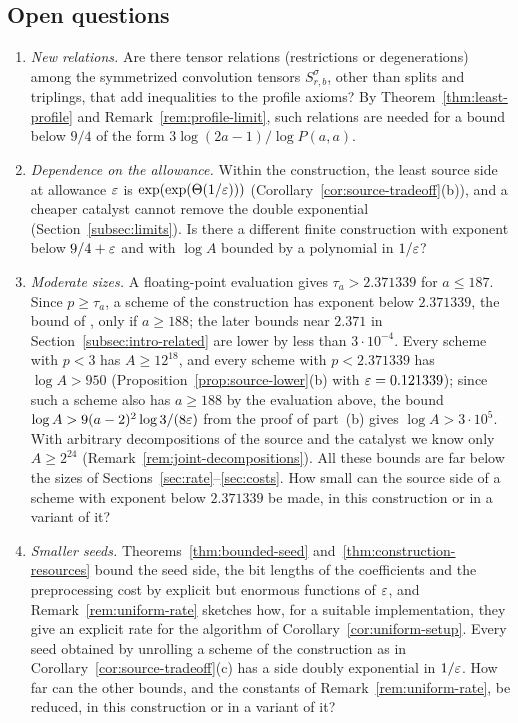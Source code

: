 \subsection{Open questions}
\label{subsec:open-questions}

\begin{enumerate}
\item \emph{New relations.} Are there tensor relations (restrictions or
degenerations) among the symmetrized convolution tensors
\(S^\sigma_{r,b}\), other than splits and triplings, that add
inequalities to the profile axioms? By Theorem~\ref{thm:least-profile}
and Remark~\ref{rem:profile-limit}, such relations are needed for a bound
below \(9/4\) of the form \(3\log(2a-1)/\log P(a,a)\).

\item \emph{Dependence on the allowance.} Within the construction, the
least source side at allowance \(\varepsilon\) is
\(\exp(\exp(\Theta(1/\varepsilon)))\)
(Corollary~\ref{cor:source-tradeoff}(b)), and a cheaper catalyst cannot
remove the double exponential (Section~\ref{subsec:limits}). Is there a
different finite construction with exponent below \(9/4+\varepsilon\) and with
\(\log A\) bounded by a polynomial in \(1/\varepsilon\)?

\item \emph{Moderate sizes.} A floating-point evaluation gives
\(\tau_a>2.371339\) for \(a\le187\). Since \(p\ge\tau_a\), a scheme of
the construction has exponent below \(2.371339\), the bound
of \citet{AD25}, only if \(a\ge188\); the later bounds near \(2.371\) in
Section~\ref{subsec:intro-related} are lower by less than
\(3\cdot10^{-4}\). Every scheme with \(p<3\) has \(A\ge12^{18}\), and
every scheme with \(p<2.371339\) has \(\log A>950\)
(Proposition~\ref{prop:source-lower}(b) with \(\varepsilon=0.121339\)); since
such a scheme also has \(a\ge188\) by the evaluation above, the bound
\(\log A>9(a-2)^2\log3/(8\varepsilon)\) from the proof of part~(b) gives
\(\log A>3\cdot10^5\). With arbitrary decompositions of the source and
the catalyst we know only \(A\ge2^{24}\)
(Remark~\ref{rem:joint-decompositions}). All these bounds are far below
the sizes of Sections~\ref{sec:rate}--\ref{sec:costs}. How small
can the source side of a scheme with exponent below \(2.371339\) be
made, in this construction or in a variant of it?

\item \emph{Smaller seeds.} Theorems~\ref{thm:bounded-seed}
and~\ref{thm:construction-resources} bound the seed side, the bit
lengths of the coefficients and the preprocessing cost by explicit but
enormous functions of \(\varepsilon\), and Remark~\ref{rem:uniform-rate}
sketches how, for a suitable implementation, they give an explicit rate
for the algorithm of Corollary~\ref{cor:uniform-setup}. Every seed
obtained by unrolling a scheme of the construction as in
Corollary~\ref{cor:source-tradeoff}(c) has a side doubly exponential in
\(1/\varepsilon\). How far can the other bounds,
and the constants of Remark~\ref{rem:uniform-rate}, be reduced, in this
construction or in a variant of it?
\end{enumerate}
